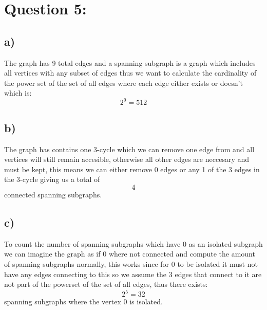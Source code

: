 \documentclass{article}
\begin{document}
\section*{Question 5:}
\subsection*{a)}
The graph has 9 total edges and a spanning subgraph is a graph which includes all vertices with any subset of edges thus we want to calculate the cardinality of the power set of the set of all edges where each edge either exists or doesn't which is: $$2^{9} = 512$$

\subsection*{b)}
The graph has contains one 3-cycle which we can remove one edge from and all vertices will still remain accesible, otherwise all other edges are neccesary and must be kept, this means we can either remove 0 edges or any 1 of the 3 edges in the 3-cycle giving us a total of $$4$$connected spanning subgraphs.

\subsection*{c)}
To count the number of spanning subgraphs which have $0$ as an isolated subgraph we can imagine the graph as if $0$ where not connected and compute the amount of spanning subgraphs normally, this works since for $0$ to be isolated it must not have any edges connecting to this so we assume the 3 edges that connect to it are not part of the powerset of the set of all edges, thus there exists: $$2^{5}=32$$spanning subgraphs where the vertex $0$ is isolated. 
\end{document}
